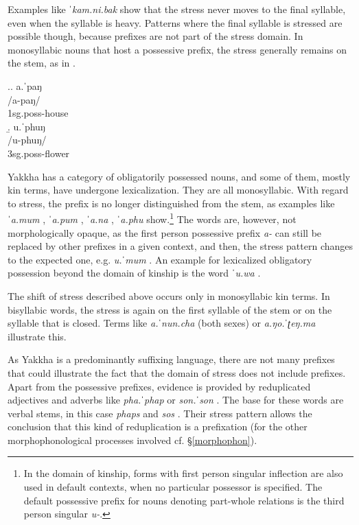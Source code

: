 Examples like \emph{ˈkam.ni.bak}  show that the stress never moves to the final syllable, even when the syllable is heavy. Patterns where the final syllable is stressed are possible though, because prefixes are not part of the stress domain. In monosyllabic nouns that host a possessive prefix, the stress generally remains on the stem, as in  \Next.


\ex.\a. \glll a.ˈpaŋ\\
/a-paŋ/\\
{\sc 1sg.poss-}house\\
\b. \glll u.ˈphuŋ\\
/u-phuŋ/\\
{\sc 3sg.poss-}flower\\


Yakkha has a category of obligatorily possessed nouns, and some of them, mostly kin terms, have undergone  lexicalization. They are all monosyllabic. With regard to  stress, the prefix is no longer distinguished from the stem, as examples like \emph{ˈa.mum} , \emph{ˈa.pum} , \emph{ˈa.na} , \emph{ˈa.phu}  show.\footnote{In the domain of kinship, forms with first person singular inflection are also used in default contexts, when no particular possessor is specified. The default possessive prefix for nouns denoting part-whole relations is the third person singular \emph{u-}.} The words are, however, not morphologically opaque, as the first person possessive prefix \emph{a-} can still be replaced by other prefixes in a given context, and then, the stress pattern changes to the expected one, e.g. \emph{u.ˈmum} . An example for lexicalized obligatory possession beyond the domain of kinship is the word \emph{ˈu.wa} .

The shift of stress described above occurs only in monosyllabic kin terms. In bisyllabic words, the stress is again on the first syllable  of the stem or on the syllable that is closed. Terms like \emph{a.ˈnun.cha}  (both sexes) or \emph{a.ŋo.ˈʈeŋ.ma}  illustrate this.


As Yakkha is a predominantly suffixing language, there are not many prefixes that could illustrate the fact that the domain of stress does not include prefixes. Apart from the possessive prefixes, evidence is provided by reduplicated adjectives and adverbs like \emph{pha.ˈphap}  or \emph{son.ˈson} . The base for these words are verbal stems, in this case \emph{phaps}  and \emph{sos} . Their stress pattern allows the conclusion that this kind of reduplication is a prefixation (for the other morphophonological processes involved cf. §\ref{morphophon}).


